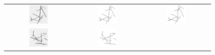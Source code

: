 \documentclass[11pt]{article}
\begin{document}
\pagebreak

\begin{figure}
  \begin{tabular}{ccc}
    \includegraphics[width=0.3\textwidth]{Images/randimage1.png}&
    \includegraphics[width=0.3\textwidth]{Images/randold1.png}&
    \includegraphics[width=0.3\textwidth]{Images/randnew1.png} \\
    \includegraphics[width=0.3\textwidth]{Images/randimage2.png}&
    \includegraphics[width=0.3\textwidth]{Images/randold2.png}&

\end{tabular}
\end{figure}
\end{document}
